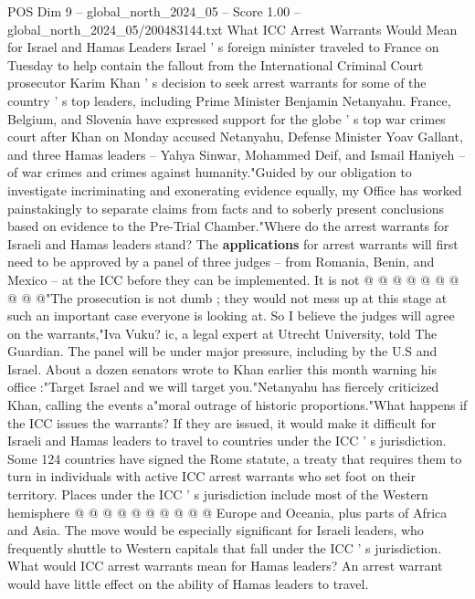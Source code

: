 \begin{textsample}{POS Dim 9 – global\_north\_2024\_05 – Score 1.00 – global\_north\_2024\_05/200483144.txt}  \label{ex:f9_pos_211}
What ICC Arrest Warrants Would Mean for Israel and Hamas Leaders Israel ' s foreign minister traveled to France on Tuesday to help contain the fallout from the International Criminal Court prosecutor Karim Khan ' s decision to seek arrest warrants for some of the country ' s top leaders, including Prime Minister Benjamin Netanyahu.
France, Belgium, and Slovenia have expressed support for the globe ' s top war crimes court after Khan on Monday accused Netanyahu, Defense Minister Yoav Gallant, and three Hamas leaders -- Yahya Sinwar, Mohammed Deif, and Ismail Haniyeh -- of war crimes and crimes against humanity."Guided by our obligation to investigate incriminating and exonerating evidence equally, my Office has worked painstakingly to separate claims from facts and to soberly present conclusions based on evidence to the Pre-Trial Chamber."Where do the arrest warrants for Israeli and Hamas leaders stand?
The \textbf{applications} for arrest warrants will first need to be approved by a panel of three judges -- from Romania, Benin, and Mexico -- at the ICC before they can be implemented.
It is not @ @ @ @ @ @ @ @ @ @"The prosecution is not dumb ; they would not mess up at this stage at such an important case everyone is looking at.
So I believe the judges will agree on the warrants,"Iva Vuku? ic, a legal expert at Utrecht University, told The Guardian.
The panel will be under major pressure, including by the U.S and Israel.
About a dozen senators wrote to Khan earlier this month warning his office :"Target Israel and we will target you."Netanyahu has fiercely criticized Khan, calling the events a"moral outrage of historic proportions."What happens if the ICC issues the warrants?
If they are issued, it would make it difficult for Israeli and Hamas leaders to travel to countries under the ICC ' s jurisdiction.
Some 124 countries have signed the Rome statute, a treaty that requires them to turn in individuals with active ICC arrest warrants who set foot on their territory.
Places under the ICC ' s jurisdiction include most of the Western hemisphere @ @ @ @ @ @ @ @ @ @ Europe and Oceania, plus parts of Africa and Asia.
The move would be especially significant for Israeli leaders, who frequently shuttle to Western capitals that fall under the ICC ' s jurisdiction.
What would ICC arrest warrants mean for Hamas leaders?
An arrest warrant would have little effect on the ability of Hamas leaders to travel.

\end{textsample}
